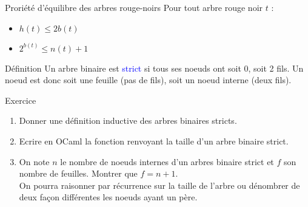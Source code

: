 \documentclass[10pt]{beamer}
\begin{document}
\begin{frame}[fragile]{\Ctitle}{\stitle}
	\begin{block}{Proriété d'équilibre des arbres rouge-noirs}
		Pour tout arbre rouge noir $t$ :
		\begin{itemize}
			\item<2-> $h(t) \leqslant 2b(t)$
			\item<3-> $2^{b(t)} \leqslant n(t) +1$
		\end{itemize}
	\end{block}
\end{frame}

\begin{frame}[fragile]{\Ctitle}{\stitle}
	\begin{block}{Définition}
		Un arbre binaire est \textcolor{blue}{strict} si tous ses noeuds ont soit 0, soit 2 fils.
		Un noeud est donc soit une feuille (pas de fils), soit un noeud interne (deux fils).
	\end{block}
\end{frame}

\begin{frame}[fragile]{\Ctitle}{\stitle}
	\begin{exampleblock}{Exercice}
		\begin{enumerate}
			\item Donner une définition inductive des arbres binaires stricts.
			\item Ecrire en OCaml la fonction renvoyant la taille d'un arbre binaire strict.
			\item On note $n$ le nombre de noeuds internes d'un arbres binaire strict et $f$ son nombre de feuilles. Montrer que $f = n +1$. \\
			      \textcolor{OliveGreen}{\small \aide \;} On pourra raisonner par récurrence sur la taille de l'arbre ou dénombrer de deux façon différentes les noeuds ayant un père.

		\end{enumerate}
	\end{exampleblock}
\end{frame}
\end{document}
